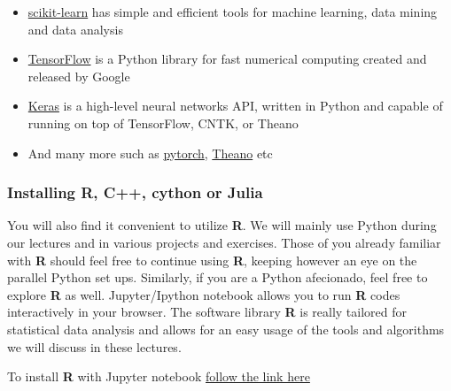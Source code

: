 \documentclass{beamer}
\begin{document}
\begin{frame}
\begin{itemize}
\item \href{{https://scikit-learn.org/stable/}}{scikit-learn} has simple and efficient tools for machine learning, data mining and data analysis

\item \href{{https://www.tensorflow.org/}}{TensorFlow} is a Python library for fast numerical computing created and released by Google

\item \href{{https://keras.io/}}{Keras} is a high-level neural networks API, written in Python and capable of running on top of TensorFlow, CNTK, or Theano

\item And many more such as \href{{https://pytorch.org/}}{pytorch},  \href{{https://pypi.org/project/Theano/}}{Theano} etc 
\end{itemize}

\noindent
\end{frame}

\begin{frame}
\frametitle{Installing R, C++, cython or Julia}

You will also find it convenient to utilize \textbf{R}. We will mainly
use Python during our lectures and in various projects and exercises.
Those of you
already familiar with \textbf{R} should feel free to continue using \textbf{R}, keeping
however an eye on the parallel Python set ups. Similarly, if you are a
Python afecionado, feel free to explore \textbf{R} as well.  Jupyter/Ipython
notebook allows you to run \textbf{R} codes interactively in your
browser. The software library \textbf{R} is really tailored  for statistical data analysis
and allows for an easy usage of the tools and algorithms we will discuss in these
lectures.

To install \textbf{R} with Jupyter notebook 
\href{{https://mpacer.org/maths/r-kernel-for-ipython-notebook}}{follow the link here}
\end{frame}
\end{document}
